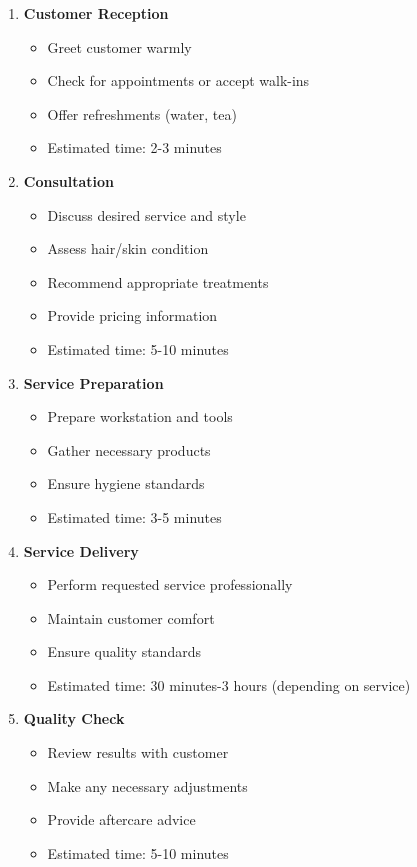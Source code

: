 \documentclass[a4paper,12pt]{article}
\begin{document}
\begin{enumerate}[leftmargin=2em]
    \item \textbf{Customer Reception}
    \begin{itemize}
        \item Greet customer warmly
        \item Check for appointments or accept walk-ins
        \item Offer refreshments (water, tea)
        \item Estimated time: 2-3 minutes
    \end{itemize}
    
    \item \textbf{Consultation}
    \begin{itemize}
        \item Discuss desired service and style
        \item Assess hair/skin condition
        \item Recommend appropriate treatments
        \item Provide pricing information
        \item Estimated time: 5-10 minutes
    \end{itemize}
    
    \item \textbf{Service Preparation}
    \begin{itemize}
        \item Prepare workstation and tools
        \item Gather necessary products
        \item Ensure hygiene standards
        \item Estimated time: 3-5 minutes
    \end{itemize}
    
    \item \textbf{Service Delivery}
    \begin{itemize}
        \item Perform requested service professionally
        \item Maintain customer comfort
        \item Ensure quality standards
        \item Estimated time: 30 minutes-3 hours (depending on service)
    \end{itemize}
    
    \item \textbf{Quality Check}
    \begin{itemize}
        \item Review results with customer
        \item Make any necessary adjustments
        \item Provide aftercare advice
        \item Estimated time: 5-10 minutes
    \end{itemize}
    

\end{enumerate}
\end{document}
